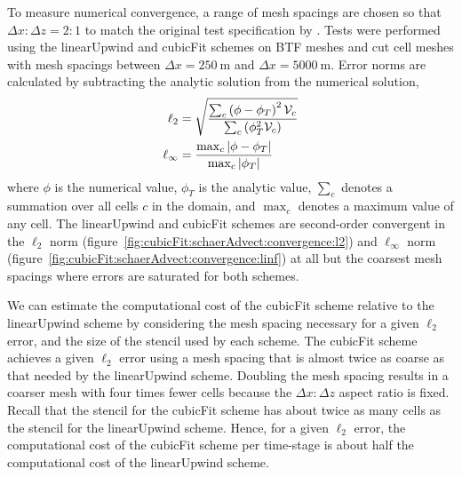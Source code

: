 To measure numerical convergence, a range of mesh spacings are chosen so that $\Delta x \mathbin{:} \Delta z = 2\mathbin{:}1$ to match the original test specification by \citet{schaer2002}.
Tests were performed using the linearUpwind and cubicFit schemes on BTF meshes and cut cell meshes with mesh spacings between $\Delta x = \SI{250}{\meter}$ and $\Delta x = \SI{5000}{\meter}$.
Error norms are calculated by subtracting the analytic solution from the numerical solution,
\begin{align}
	\ell_2 &= \sqrt{\frac{\sum_c \left(\phi - \phi_T \right)^2 \mathcal{V}_c}{\sum_c \left(\phi_T^2 \mathcal{V}_c \right)}} \label{eqn:l2-error} \\
	\ell_\infty &= \frac{\max_c \left\lvert \phi - \phi_T \right\rvert}{\max_c \left\lvert \phi_T \right\rvert} \label{eqn:linf-error}
\end{align}
where $\phi$ is the numerical value, $\phi_T$ is the analytic value, $\sum_c$ denotes a summation over all cells $c$ in the domain, and $\max_c$ denotes a maximum value of any cell.
The linearUpwind and cubicFit schemes are second-order convergent in the $\ell_2$ norm (figure~\ref{fig:cubicFit:schaerAdvect:convergence:l2}) and $\ell_\infty$ norm (figure~\ref{fig:cubicFit:schaerAdvect:convergence:linf}) at all but the coarsest mesh spacings where errors are saturated for both schemes.

We can estimate the computational cost of the cubicFit scheme relative to the linearUpwind scheme by considering the mesh spacing necessary for a given $\ell_2$ error, and the size of the stencil used by each scheme.
The cubicFit scheme achieves a given $\ell_2$ error using a mesh spacing that is almost twice as coarse as that needed by the linearUpwind scheme.  Doubling the mesh spacing results in a coarser mesh with four times fewer cells because the $\Delta x \mathbin{:} \Delta z$ aspect ratio is fixed.
Recall that the stencil for the cubicFit scheme has about twice as many cells as the stencil for the linearUpwind scheme.
Hence, for a given $\ell_2$ error, the computational cost of the cubicFit scheme per time-stage is about half the computational cost of the linearUpwind scheme.

